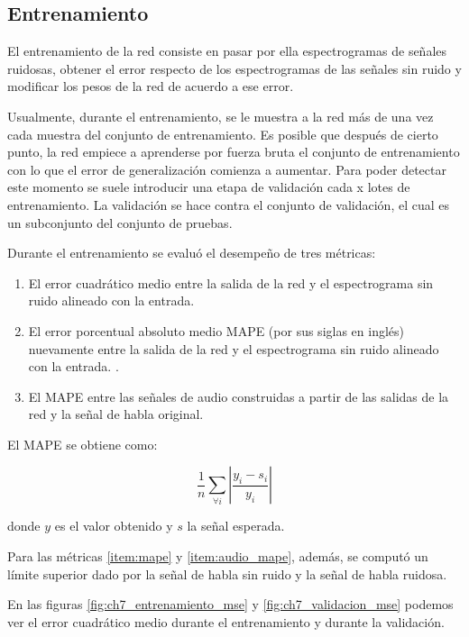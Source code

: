 \subsection{Entrenamiento}

El entrenamiento de la red consiste en pasar por ella espectrogramas de señales ruidosas, obtener el error respecto de los espectrogramas de las señales sin ruido y modificar los pesos de la red de acuerdo a ese error.

Usualmente, durante el entrenamiento, se le muestra a la red más de una vez cada muestra del conjunto de entrenamiento. Es posible que después de cierto punto, la red empiece a aprenderse por fuerza bruta el conjunto de entrenamiento con lo que el error de generalización comienza a aumentar. Para poder detectar este momento se suele introducir una etapa de validación cada x lotes de entrenamiento. La validación se hace contra el conjunto de validación, el cual es un subconjunto del conjunto de pruebas.

Durante el entrenamiento se evaluó el desempeño de tres métricas:

\begin{enumerate}
	\item El error cuadrático medio entre la salida de la red y el espectrograma sin ruido alineado con la entrada.
	\item El error porcentual absoluto medio MAPE (por sus siglas en inglés) nuevamente entre la salida de la red y el espectrograma sin ruido alineado con la entrada. \label{item:mape}.
	\item El MAPE entre las señales de audio construidas a partir de las salidas de la red y la señal de habla original. \label{item:audio_mape}
\end{enumerate}

El MAPE se obtiene como:

\begin{equation*}
	\frac{1}{n} \sum_{\forall i} \left| \frac{y_i - s_i}{y_i} \right|
\end{equation*}

donde $y$ es el valor obtenido y $s$ la señal esperada.

Para las métricas \ref{item:mape} y \ref{item:audio_mape}, además, se computó un límite superior dado por la señal de habla sin ruido y la señal de habla ruidosa.

En las figuras \ref{fig:ch7_entrenamiento_mse} y \ref{fig:ch7_validacion_mse} podemos ver el error cuadrático medio durante el entrenamiento y durante la validación.

